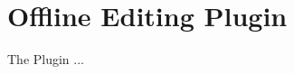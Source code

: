 
\section{Offline Editing Plugin}\label{sec:offlinedit}

\updatedisclaimer

The  Plugin ...

\FloatBarrier
